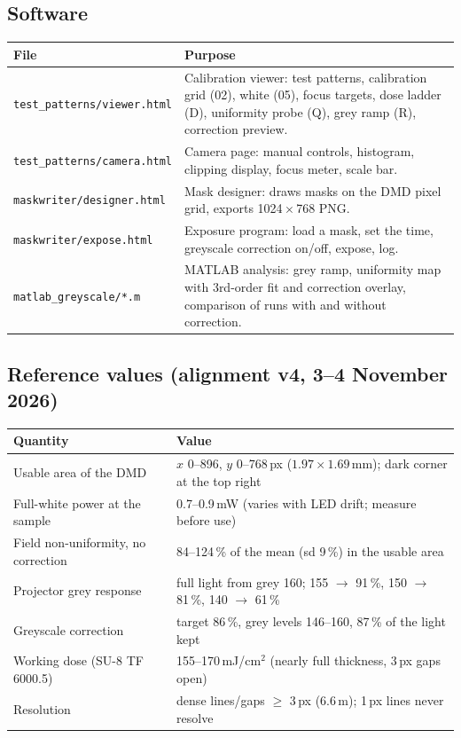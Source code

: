 \documentclass[11pt,a4paper]{article}
\newcommand{\um}{\,\textmu m}
\newcommand{\file}[1]{\texttt{#1}}
\begin{document}
\subsection{Software}
\begin{table}[H]\centering\small
\begin{tabularx}{\linewidth}{@{}lX@{}}
\toprule
File & Purpose \\
\midrule
\file{test\_patterns/viewer.html} & Calibration viewer: test patterns, calibration grid (02), white (05),
      focus targets, dose ladder (D), uniformity probe (Q), grey ramp (R), correction preview. \\
\file{test\_patterns/camera.html} & Camera page: manual controls, histogram, clipping display, focus meter, scale bar. \\
\file{maskwriter/designer.html} & Mask designer: draws masks on the DMD pixel grid, exports 1024\,$\times$\,768 PNG. \\
\file{maskwriter/expose.html} & Exposure program: load a mask, set the time, greyscale correction on/off, expose, log. \\
\file{matlab\_greyscale/*.m} & MATLAB analysis: grey ramp, uniformity map with 3rd-order fit and correction
      overlay, comparison of runs with and without correction. \\
\bottomrule
\end{tabularx}
\end{table}

\subsection{Reference values (alignment v4, 3--4 November 2026)}
\begin{table}[H]\centering\small
\begin{tabular}{@{}ll@{}}
\toprule
Quantity & Value \\
\midrule
Usable area of the DMD & $x$ 0--896, $y$ 0--768\,px ($1.97\times1.69$\,mm); dark corner at the top right \\
Full-white power at the sample & 0.7--0.9\,mW (varies with LED drift; measure before use) \\
Field non-uniformity, no correction & 84--124\,\% of the mean (sd 9\,\%) in the usable area \\
Projector grey response & full light from grey 160; 155 $\to$ 91\,\%, 150 $\to$ 81\,\%, 140 $\to$ 61\,\% \\
Greyscale correction & target 86\,\%, grey levels 146--160, 87\,\% of the light kept \\
Working dose (SU-8 TF 6000.5) & 155--170\,mJ/cm$^2$ (nearly full thickness, 3\,px gaps open) \\
Resolution & dense lines/gaps $\geq$ 3\,px (6.6\um); 1\,px lines never resolve \\
\bottomrule
\end{tabular}
\end{table}
\end{document}
